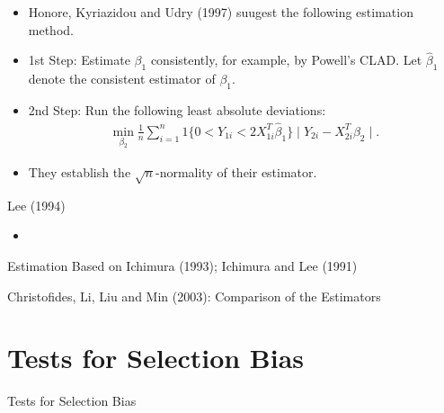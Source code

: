 \documentclass[xcolor=svgnames,dvipdfmx,cjk]{beamer}
\theoremstyle{example}
\begin{document}
\begin{frame}
      \begin{itemize}
            \item Honore, Kyriazidou and Udry (1997) suugest the following estimation method.
            \item \alert{1st Step}: Estimate $\beta_1$ consistently, 
                  for example, by Powell's CLAD.
                  Let $\hat{\beta}_1$ denote the consistent estimator of $\beta_1$.
            \item \alert{2nd Step}: Run the following least absolute deviations:
                  \begin{align*}
                        \min_{\beta_2} \frac{1}{n} \sum_{i=1}^n
                                       1\{
                                          0 < Y_{1i} < 2 X_{1i}^T \hat{\beta}_1
                                       \}
                                       \mid Y_{2i} - X_{2i}^T \beta_2 \mid.
                  \end{align*}
            \item They establish the $\sqrt{n}$-normality of their estimator.
      \end{itemize}
\end{frame}


\begin{frame}{Lee (1994)}
      \begin{itemize}
            \item 
      \end{itemize}
\end{frame}



\begin{frame}{Estimation Based on Ichimura (1993); Ichimura and Lee (1991)}
      
\end{frame}

\begin{frame}{Christofides, Li, Liu and Min (2003): Comparison of the Estimators}
      
\end{frame}

\section{Tests for Selection Bias}

\begin{frame}{Tests for Selection Bias}
      
\end{frame}
\end{document}
